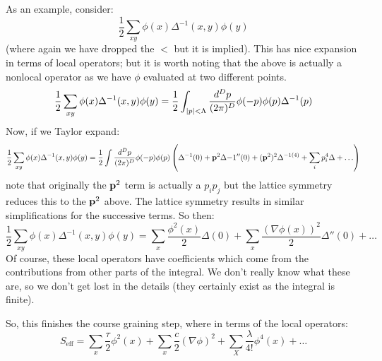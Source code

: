 As an example, consider:
\begin{equation}
    \frac{1}{2}\sum_{xy}\phi(x)\Delta^{-1}(x, y)\phi(y)
\end{equation}
(where again we have dropped the $<$ but it is implied). This has nice expansion in terms of local operators; but it is worth noting that the above is actually a nonlocal operator as we have $\phi$ evaluated at two different points.
\begin{equation}
    \frac{1}{2}\sum_{xy}\phi(x)\Delta^{-1}(x, y)\phi(y) = \frac{1}{2}\int_{\abs{p} < \Lambda} \frac{d^Dp}{(2\pi)^D}\phi(-p)\phi(p)\Delta^{-1}(p)
\end{equation}
Now, if we Taylor expand:
\begin{equation}
    \frac{1}{2}\sum_{xy}\phi(x)\Delta^{-1}(x, y)\phi(y) = \frac{1}{2}\int \frac{d^Dp}{(2\pi)^D}\phi(-p)\phi(p)\left(\Delta^{-1}(0) + \v{p}^2\Delta{-1''}(0) + (\v{p}^2)^{2}\Delta^{-1(4)} + \sum_i p_i^4 \Delta + \ldots\right)
\end{equation}
note that originally the $\mathbf{p}^2$ term is actually a $p_ip_j$ but the lattice symmetry reduces this to the $\mathbf{p}^2$ above. The lattice symmetry results in similar simplifications for the successive terms. So then:
\begin{equation}
    \frac{1}{2}\sum_{xy}\phi(x)\Delta^{-1}(x, y)\phi(y) = \sum_x \frac{\phi^2(x)}{2}\Delta(0) + \sum_x \frac{(\nabla \phi(x))^2}{2}\Delta''(0) + \ldots
\end{equation}
Of course, these local operators have coefficients which come from the contributions from other parts of the integral. We don't really know what these are, so we don't get lost in the details (they certainly exist as the integral is finite).

So, this finishes the course graining step, where in terms of the local operators:
\begin{equation}
    S_{\text{eff}} = \sum_x \frac{\tau}{2}\phi^2(x) + \sum_x \frac{c}{2}(\nabla \phi)^2 + \sum_X \frac{\lambda}{4!}\phi^4(x) + \ldots 
\end{equation}

